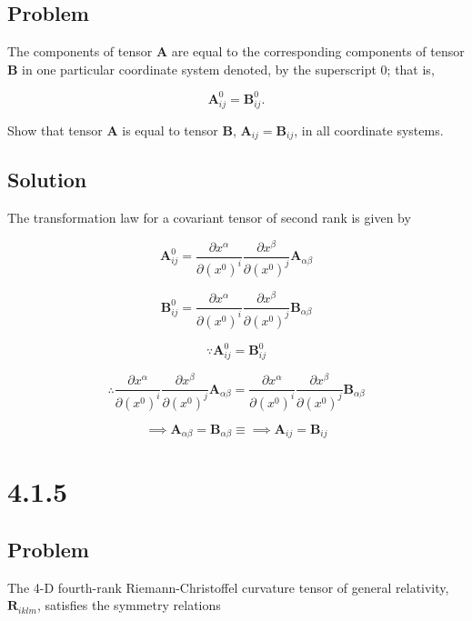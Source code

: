 \documentclass[12pt]{article}
\begin{document}
\subsection{Problem}

The components of tensor \textbf{A} are equal to the corresponding components
of tensor \textbf{B} in one particular coordinate system denoted, by the
superscript 0; that is,

\[
    \textbf{A}^0_{ij} = \textbf{B}^0_{ij}.
\]

Show that tensor \textbf{A} is equal to tensor \textbf{B},
\(\textbf{A}_{ij} = \textbf{B}_{ij}\), in all coordinate systems.

\subsection{Solution}

The transformation law for a covariant tensor of second rank is given by

\[
    \textbf{A}^0_{ij} =
    \frac{\partial x^\alpha}{\partial {\left(x^0\right)}^i}
    \frac{\partial x^\beta}{\partial {\left(x^0\right)}^j}
    \textbf{A}_{\alpha \beta}
\]

\[
    \textbf{B}^0_{ij} =
    \frac{\partial x^\alpha}{\partial {\left(x^0\right)}^i}
    \frac{\partial x^\beta}{\partial {\left(x^0\right)}^j}
    \textbf{B}_{\alpha \beta}
\]

\[
    \because \textbf{A}^0_{ij} = \textbf{B}^0_{ij}
\]

\[
    \therefore
    \frac{\partial x^\alpha}{\partial {\left(x^0\right)}^i}
    \frac{\partial x^\beta}{\partial {\left(x^0\right)}^j}
    \textbf{A}_{\alpha \beta} =
    \frac{\partial x^\alpha}{\partial {\left(x^0\right)}^i}
    \frac{\partial x^\beta}{\partial {\left(x^0\right)}^j}
    \textbf{B}_{\alpha \beta}
\]

\[
    \implies \textbf{A}_{\alpha \beta} = \textbf{B}_{\alpha \beta} \equiv
    \implies \textbf{A}_{ij} = \textbf{B}_{ij}
\]

\newpage
\section{4.1.5}

\subsection{Problem}

The 4-D fourth-rank Riemann-Christoffel curvature tensor of general relativity,
\(\textbf{R}_{iklm}\), satisfies the symmetry relations
\end{document}
